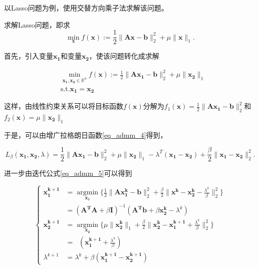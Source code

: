 以Lasso问题为例，使用交替方向乘子法求解该问题。

\begin{problem}
    求解Lasso问题，即求
    \begin{equation}
        \mathop{\mathrm{min}}\limits_{\bm{x}} f(\bm{x}) := \frac{1}{2}\|\bm{A} \bm{x}-\bm{b}\|_{2}^{2} + \mu\|\bm{x}\|_{1}.
    \end{equation}
\end{problem}

\begin{solution}
    首先，引入变量$\bm{x_{1}}$和变量$\bm{x_{2}}$，使该问题转化成求解

    \begin{equation}
        \begin{split}
            &\mathop{\mathrm{min}}\limits_{\bm{x_{1}, x_{2}}\in \mathbb{R}^{n}} f(\bm{x}) := \frac{1}{2}\|\bm{A} \bm{x_{1}}-\bm{b}\|_{2}^{2} + \mu\|\bm{x_{2}}\|_{1} \\
            &\mathrm{s. t.} \bm{x_{1}} = \bm{x_{2}}
        \end{split}
    \end{equation}

    这样，由线性约束关系可以将目标函数$f(\bm{x})$分解为$f_{1}(\bm{x}) = \frac{1}{2}\|\bm{A} \bm{x_{1}}-\bm{b}\|_{2}^{2}$和$f_{2}(\bm{x}) = \mu\|\bm{x_{2}}\|_{1}$

    于是，可以由增广拉格朗日函数\ref{eq_admm_4}得到，

    \begin{equation*}
        L_{\beta}(\bm{x_{1}}, \bm{x_{2}}, \lambda) = \frac{1}{2} \|\bm{Ax_{1}-b}\|_{2}^{2} + \mu \|\bm{x_{2}}\|_{1} - \lambda^{T}(\bm{x_{1}-x_{2}}) + \frac{\beta}{2} \|\bm{x_{1}-x_{2}}\|_{2}^{2}.
    \end{equation*}

    进一步由迭代公式\ref{eq_admm_5}可以得到

    \begin{equation}
        \begin{cases}
            \bm{x_{1}^{k+1}} &= \mathop{\mathrm{argmin}}\limits_{\bm{x_{1}}} \{ \frac{1}{2}\|\bm{Ax_{1}^{k}}-\bm{b}\|_{2}^{2} + \frac{\beta}{2}\|\bm{x^{k}} - \bm{x_{2}^{k}} -\frac{\lambda^{k}}{\beta}\|_{2}^{2} \} \\
                             &= (\bm{A^{T}A}+\beta\bm{I})^{-1}(\bm{A^{T}b} + \beta\bm{x_{2}^{k}} - \lambda^{k}) \\
            \bm{x_{2}^{k+1}} &= \mathop{\mathrm{argmin}}\limits_{\bm{x_{2}}} \{ \mu\|\bm{x_{2}^{k}}\|_{1} + \frac{\beta}{2} \|\bm{x_{2}^{k}}-\bm{x_{1}^{k+1}}+\frac{\lambda^{k}}{\beta}\|_{2}^{2}\} \\
                             &= \mathop{\mathrm{prox_{\frac{\mu}{\beta}\|\cdot\|_{1}}}}(\bm{x_{1}^{k+1}} + \frac{\lambda^{k}}{\beta}) \\
            \lambda^{k+1} &= \lambda^{k} + \beta(\bm{x_{1}^{k+1}-\bm{x_{2}^{k+1}}})
        \end{cases}
    \end{equation}


\end{solution}
